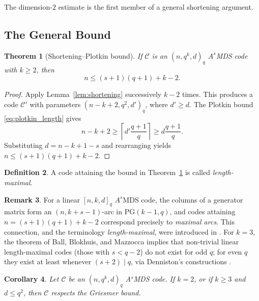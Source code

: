 \documentclass[12pt, letterpaper]{article}
\theoremstyle{plain}
\newtheorem{theorem}{Theorem}[section]
\newtheorem{corollary}[theorem]{Corollary}
\theoremstyle{definition}
\newtheorem{definition}[theorem]{Definition}
\newtheorem{remark}[theorem]{Remark}
\begin{document}
	The dimension-$2$ estimate is the first member of a general shortening argument.

	\subsection{The General Bound}
	\label{sec:general_bound}

	\begin{theorem}[Shortening--Plotkin bound]\label{thm:main_bound}
		If $\mathcal{C}$ is an $(n, q^k, d)_q$ $A^s$MDS code with $k \ge 2$,
		then
		\begin{equation}\label{eqn:maximal_arc_bound}
			n \le (s+1)(q+1) + k - 2.
		\end{equation}
	\end{theorem}
	
	\begin{proof}
		Apply Lemma~\ref{lem:shortening} successively $k-2$ times. This produces a code $\mathcal C'$ with parameters $(n-k+2,q^2,d')_q$, where $d'\ge d$. The  Plotkin bound \eqref{eq:plotkin_length} gives
		\[
		 n-k+2\ge \left\lceil d'\frac{q+1}{q}\right\rceil \ge d\frac{q+1}{q}.
		\]
		Substituting $d=n-k+1-s$ and rearranging yields $n\le (s+1)(q+1)+k-2$.
	\end{proof}
	
	\begin{definition}\label{def:length_maximal}
		A code attaining the bound in Theorem~\ref{thm:main_bound} is called \emph{length-maximal}.
	\end{definition}
	
	\begin{remark}\label{rem:projective_connection}
		For a linear $[n,k,d]_q$ $A^s$MDS code, the columns of a generator matrix form an $(n, k+s-1)$-arc in $\mathrm{PG}(k-1,q)$, and
		codes attaining $n = (s+1)(q+1)+k-2$ correspond precisely to \emph{maximal arcs}. This connection, and the terminology \emph{length-maximal}, were introduced in \cite{alderson2025projectivesystems}. For $k = 3$, the theorem of Ball, Blokhuis, and Mazzocca
		\cite{Ball1997MaximalArcs} implies that non-trivial linear length-maximal codes (those with $s < q-2$) do not exist for odd $q$; for even $q$
		they exist at least whenever $(s+2) \mid q$, via Denniston's constructions \cite{Denniston1969}.
	\end{remark}
	
	\begin{corollary} \label{cor:griesmer_d_small}
		Let $\mathcal{C}$ be an $(n,q^k,d)_q$ A$^s$MDS code. If $k=2$, or if $k\ge 3$ and $d\le q^2$, then $\mathcal{C}$ respects the Griesmer bound.
	\end{corollary}
\end{document}
